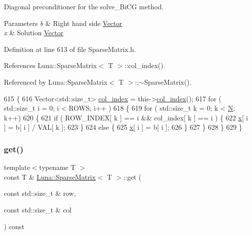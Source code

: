 Diagonal preconditioner for the solve\+\_\+\+Bi\+CG method. 


\begin{DoxyParams}{Parameters}
{\em b} & Right hand side \hyperlink{classLuna_1_1Vector}{Vector} \\
\hline
{\em x} & Solution \hyperlink{classLuna_1_1Vector}{Vector} \\
\hline
\end{DoxyParams}


Definition at line 613 of file Sparse\+Matrix.\+h.



References Luna\+::\+Sparse\+Matrix$<$ T $>$\+::col\+\_\+index().



Referenced by Luna\+::\+Sparse\+Matrix$<$ T $>$\+::$\sim$\+Sparse\+Matrix().


\begin{DoxyCode}
615   \{
616     Vector<std::size\_t> \hyperlink{classLuna_1_1SparseMatrix_ae7f456c12b3075f21b15bb4ee114d8af}{col\_index} = this->\hyperlink{classLuna_1_1SparseMatrix_ae7f456c12b3075f21b15bb4ee114d8af}{col\_index}();
617     \textcolor{keywordflow}{for} ( std::size\_t i = 0; i < ROWS; i++ )
618     \{
619       \textcolor{keywordflow}{for} ( std::size\_t k = 0; k < \hyperlink{namespaceHeat__plot_a7d050092798e28458a263710837bda77}{N}; k++)
620       \{
621         \textcolor{keywordflow}{if} ( ROW\_INDEX[ k ] == i && col\_index[ k ] == i ) \{
622           \hyperlink{namespaceHeat__plot_aa88370c16b85b784ccbde3ed88bc1991}{x}[ i ] = b[ i ] / VAL[ k ];
623         \}
624         \textcolor{keywordflow}{else} \{
625           \hyperlink{namespaceHeat__plot_aa88370c16b85b784ccbde3ed88bc1991}{x}[ i ] = b[ i ];
626         \}
627       \}
628     \}
629   \}
\end{DoxyCode}
\mbox{\label{classLuna_1_1SparseMatrix_a2d19f0b3329cfde15c6c852ecb6e27c7}} 
\subsubsection{\texorpdfstring{get()}{get()}}
{\footnotesize\ttfamily template$<$typename T $>$ \\
const T \& \hyperlink{classLuna_1_1SparseMatrix}{Luna\+::\+Sparse\+Matrix}$<$ T $>$\+::get (\begin{DoxyParamCaption}\item[{const std\+::size\+\_\+t \&}]{row,  }\item[{const std\+::size\+\_\+t \&}]{col }\end{DoxyParamCaption}) const\hspace{0.3cm}{\ttfamily [inline]}}



